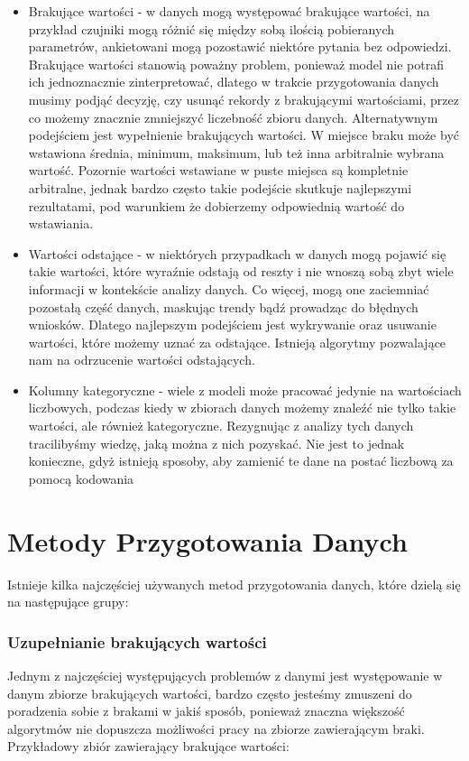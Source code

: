 \documentclass[oneside]{book}
\begin{document}
\begin{itemize}
\item Brakujące wartości -
w danych mogą występować brakujące wartości, na przykład czujniki 
mogą różnić się między sobą ilością pobieranych parametrów, 
ankietowani mogą pozostawić niektóre pytania bez odpowiedzi. 
Brakujące wartości stanowią poważny problem, ponieważ model nie 
potrafi ich jednoznacznie zinterpretować, dlatego w trakcie 
przygotowania danych musimy podjąć decyzję, czy usunąć rekordy z 
brakującymi wartościami, przez co możemy znacznie zmniejszyć 
liczebność zbioru danych. Alternatywnym podejściem jest wypełnienie 
brakujących wartości. W miejsce braku może być wstawiona średnia, 
minimum, maksimum, lub też inna arbitralnie wybrana wartość. 
Pozornie wartości wstawiane w puste miejsca są kompletnie arbitralne, 
jednak bardzo często takie podejście skutkuje najlepszymi rezultatami, 
pod warunkiem że dobierzemy odpowiednią wartość do wstawiania. \cite{missing_values}
\item Wartości odstające -
w niektórych przypadkach w danych mogą pojawić się takie wartości, 
które wyraźnie odstają od reszty i nie wnoszą sobą zbyt wiele 
informacji w kontekście analizy danych. Co więcej, mogą one 
zaciemniać pozostałą część danych, maskując trendy bądź prowadząc 
do błędnych wniosków. Dlatego najlepszym podejściem jest wykrywanie 
oraz usuwanie wartości, które możemy uznać za odstające. 
Istnieją algorytmy pozwalające nam na odrzucenie wartości odstających. \cite{outlier_detection}
\item Kolumny kategoryczne -
wiele z modeli może pracować jedynie na wartościach liczbowych, 
podczas kiedy w zbiorach danych możemy znaleźć nie tylko takie wartości, 
ale również kategoryczne. Rezygnując z analizy tych danych tracilibyśmy 
wiedzę, jaką można z nich pozyskać. Nie jest to jednak konieczne, 
gdyż istnieją sposoby, aby zamienić te dane na postać liczbową za 
pomocą kodowania \cite{enconding}

\end{itemize}



\chapter{Metody Przygotowania Danych}
Istnieje kilka najczęściej używanych metod przygotowania danych, 
które dzielą się na następujące grupy:

\subsection*{Uzupełnianie brakujących wartości}
Jednym z najczęściej występujących problemów z 
danymi jest występowanie w danym zbiorze 
brakujących wartości, bardzo często jesteśmy 
zmuszeni do poradzenia sobie z brakami w jakiś sposób,
ponieważ znaczna większość algorytmów nie dopuszcza 
możliwości pracy na zbiorze zawierającym braki.
Przykładowy zbiór zawierający brakujące wartości:
\end{document}
